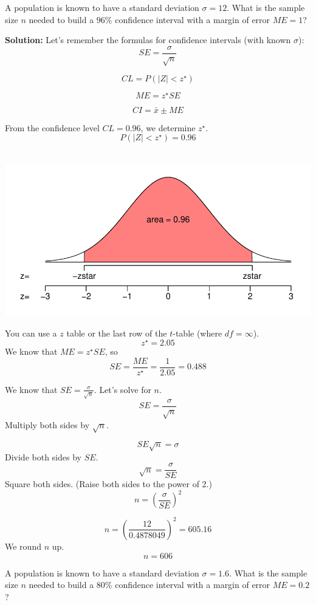 \documentclass[11pt,containsverbatim,handout]{beamer}
\newcommand{\soln}[1]{ }
\begin{document}
\begin{frame}
A population is known to have a standard deviation \(\sigma=12\). What
is the sample size \(n\) needed to build a \(96\%\) confidence interval
with a margin of error \(ME=1\)?

\pause
{\bf Solution:}
Let's remember the formulas for confidence intervals (with known
\(\sigma\)): \[SE = \frac{\sigma}{\sqrt{n}} \]

\[CL = P(|Z| < z^{\star})\]

\[ME = z^{\star}SE \]

\[CI = \bar{x} \pm ME \]

From the confidence level \(CL=0.96\), we determine \(z^{\star}\).
\[P(|Z|<z^\star) = 0.96 \]\\
\end{frame}

\begin{frame}
\includegraphics[scale=0.5]{CL_sketch-1a.pdf}

You can use a \(z\) table or the last row of the \(t\)-table (where
\(df=\infty\)). \[z^\star = 2.05 \] We know that \(ME=z^{\star}SE\), so
\[SE = \frac{ME}{z^{\star}} = \frac{1}{2.05} = 0.488 \]

We know that \(SE = \frac{\sigma}{\sqrt{n}}\). Let's solve for \(n\).
\[SE = \frac{\sigma}{\sqrt{n}}\] Multiply both sides by \(\sqrt{n}\).
\end{frame}

\begin{frame}
\[SE\sqrt{n}  = \sigma\] Divide both sides by \(SE\).
\[\sqrt{n} = \frac{\sigma}{SE}\] Square both sides. (Raise both sides to
the power of 2.) \[n = \left(\frac{\sigma}{SE}\right)^2\]

\[n = \left(\frac{12}{0.4878049}\right)^2 = 605.16 \] We round \(n\) up.
\[n = 606 \]
\end{frame}


\begin{frame}
A population is known to have a standard deviation \(\sigma=1.6\). What
is the sample size \(n\) needed to build a \(80\%\) confidence interval
with a margin of error \(ME=0.2\)?

\pause

\soln{
\[z^\star = 1.28 \]

\[SE = \frac{ME}{z^{\star}} = \frac{0.2}{1.28} = 0.156 \]

\[n = \left(\frac{1.6}{0.15625}\right)^2 = 104.8576 \]

\[n = 105 \]
}

\end{frame}
\end{document}
